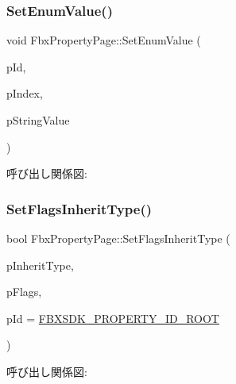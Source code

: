 \mbox{\label{class_fbx_property_page_ab1feda794f3e03401945ba60f7216f1c}} 
\subsubsection{\texorpdfstring{Set\+Enum\+Value()}{SetEnumValue()}}
{\footnotesize\ttfamily void Fbx\+Property\+Page\+::\+Set\+Enum\+Value (\begin{DoxyParamCaption}\item[{\hyperlink{fbxtypes_8h_a088fa96de3b0b3ea69f0f6afef525dfb}{Fbx\+Int}}]{p\+Id,  }\item[{int}]{p\+Index,  }\item[{const char $\ast$}]{p\+String\+Value }\end{DoxyParamCaption})}

呼び出し関係図\+:
\mbox{\label{class_fbx_property_page_a34e74fbbf03330b4eab318261520f2bc}} 
\subsubsection{\texorpdfstring{Set\+Flags\+Inherit\+Type()}{SetFlagsInheritType()}}
{\footnotesize\ttfamily bool Fbx\+Property\+Page\+::\+Set\+Flags\+Inherit\+Type (\begin{DoxyParamCaption}\item[{\hyperlink{class_fbx_property_flags_ae3b667a4fcac4b827fa186a698fec2f8}{Fbx\+Property\+Flags\+::\+E\+Inherit\+Type}}]{p\+Inherit\+Type,  }\item[{\hyperlink{class_fbx_property_flags_afabfa7e0949aac8a7dcdf8a141867e99}{Fbx\+Property\+Flags\+::\+E\+Flags}}]{p\+Flags,  }\item[{\hyperlink{fbxtypes_8h_a088fa96de3b0b3ea69f0f6afef525dfb}{Fbx\+Int}}]{p\+Id = {\ttfamily \hyperlink{fbxpropertydef_8h_a291bdb6d8428dce8463143fa3aba2c34}{F\+B\+X\+S\+D\+K\+\_\+\+P\+R\+O\+P\+E\+R\+T\+Y\+\_\+\+I\+D\+\_\+\+R\+O\+OT}} }\end{DoxyParamCaption})}

呼び出し関係図\+:
\mbox{\label{class_fbx_property_page_a275529ba7d07a27932856d8e5eb1e936}} 

